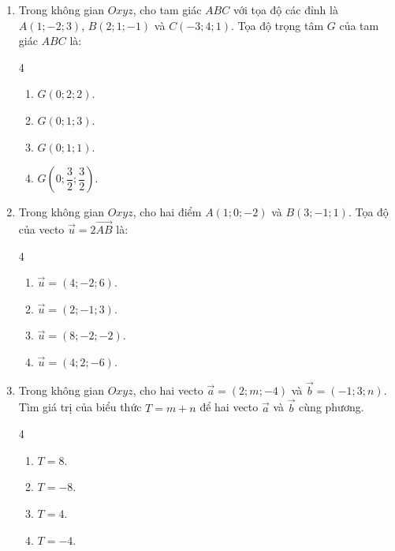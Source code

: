 \documentclass[12pt]{article}
\begin{document}
\begin{enumerate}[label=\textbf{Câu \arabic*.}, leftmargin=*]
		\item Trong không gian $Oxyz$, cho tam giác $ABC$ với tọa độ các đỉnh là $A(1; -2; 3)$, $B(2; 1; -1)$ và $C(-3; 4; 1)$. Tọa độ trọng tâm $G$ của tam giác $ABC$ là:
		\begin{multicols}{4}
			\begin{enumerate}[label=\Alph*.]
				\item $G(0; 2; 2)$.
				\item $G(0; 1; 3)$.
				\item $G(0; 1; 1)$.
				\item $G\left(0; \dfrac{3}{2}; \dfrac{3}{2}\right)$.
			\end{enumerate}
		\end{multicols}
		
		\item Trong không gian $Oxyz$, cho hai điểm $A(1; 0; -2)$ và $B(3; -1; 1)$. Tọa độ của vecto $\vec{u} = 2\overrightarrow{AB}$ là:
		\begin{multicols}{4}
			\begin{enumerate}[label=\Alph*.]
				\item $\vec{u} = (4; -2; 6)$.
				\item $\vec{u} = (2; -1; 3)$.
				\item $\vec{u} = (8; -2; -2)$.
				\item $\vec{u} = (4; 2; -6)$.
			\end{enumerate}
		\end{multicols}
		
		\item Trong không gian $Oxyz$, cho hai vecto $\vec{a} = (2; m; -4)$ và $\vec{b} = (-1; 3; n)$. Tìm giá trị của biểu thức $T = m + n$ để hai vecto $\vec{a}$ và $\vec{b}$ cùng phương.
		\begin{multicols}{4}
			\begin{enumerate}[label=\Alph*.]
				\item $T = 8$.
				\item $T = -8$.
				\item $T = 4$.
				\item $T = -4$.
			\end{enumerate}
		\end{multicols}
		

\end{enumerate}
\end{document}
